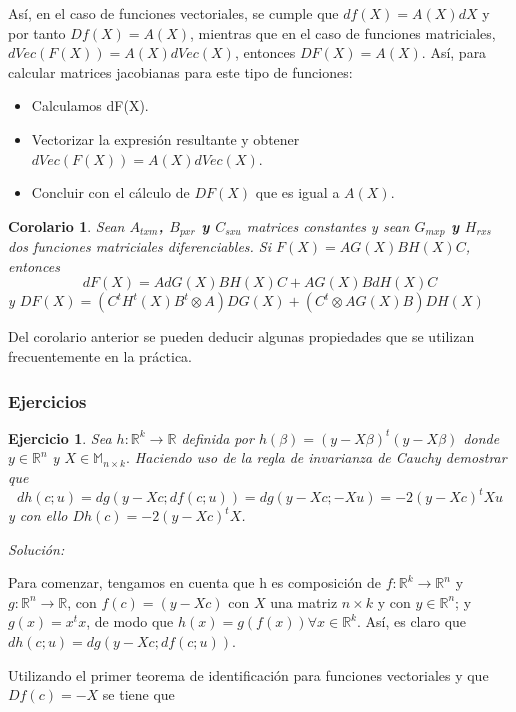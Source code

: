 \documentclass{article}
\theoremstyle{theorem-style}  %
\newtheorem{corollary}[theorem]{Corolario} %
\theoremstyle{definition-style}
\theoremstyle{example-style}
\theoremstyle{exercise-style}
\newtheorem{exercise}{Ejercicio}[section]
\begin{document}
	Así, en el caso de funciones vectoriales, se cumple que $df(X)=A(X)dX$ y por tanto $Df(X)=A(X)$, mientras que en el caso de funciones matriciales, $dVec(F(X))=A(X)dVec(X)$, entonces $DF(X)=A(X)$. Así, para calcular matrices jacobianas para este tipo de funciones:
	
	\begin{itemize}
		\item Calculamos dF(X).
		\item Vectorizar la expresión resultante y obtener $dVec(F(X))=A(X)dVec(X)$.
		\item Concluir con el cálculo de $DF(X)$ que es igual a $A(X)$.
	\end{itemize}
	
	\begin{corollary}
		Sean \textbf{$A_{txm}$, $B_{pxr}$ y $C_{sxu}$} matrices constantes y sean \textbf{$G_{mxp}$ y $H_{rxs}$} dos funciones matriciales diferenciables. Si \textbf{$F(X) = AG(X)BH(X)C$}, entonces
		\textbf{$$ dF(X)= AdG(X)BH(X)C + AG(X)BdH(X)C $$}
		y \textbf{$DF(X)= (C^tH^t(X)B^t \otimes A)DG(X) + (C^t \otimes AG(X)B)DH(X)$} 
	\end{corollary}
	
	Del corolario anterior se pueden deducir algunas propiedades que se utilizan frecuentemente en la práctica.
	
	\subsubsection{Ejercicios}
	
	\begin{exercise}
		Sea $h: \mathbb{R}^k \rightarrow \mathbb{R}$ definida por $h(\beta) = (y-X\beta)^t(y-X\beta)$ donde $y \in \mathbb{R}^n$ y $X\in\mathbb{M}_{n\times k}.$ Haciendo uso de la regla de invarianza de Cauchy demostrar que
		$$dh(c;u) = dg(y-Xc;df(c;u)) = dg(y-Xc;-Xu)=-2(y-Xc)^tXu$$
		y con ello $Dh(c)=-2(y-Xc)^tX$.
	\end{exercise}
	\textit{Solución: }
	
	
	Para comenzar, tengamos en cuenta que h es composición de $f: \mathbb{R}^k \rightarrow \mathbb{R}^n$ y $g:\mathbb{R}^n \rightarrow \mathbb{R}$, con $f(c) = (y-Xc)$ con $X$ una matriz $n \times k$ y con $y \in \mathbb{R}^n$; y $g(x) = x^tx$, de modo que $h(x)=g(f(x)) \forall x \in  \mathbb{R}^k$. Así, es claro que  $dh(c;u) = dg(y-Xc;df(c;u))$.
	
	
	Utilizando el primer teorema de identificación para funciones vectoriales y que $Df(c) = -X$ se tiene que
	
\end{document}
